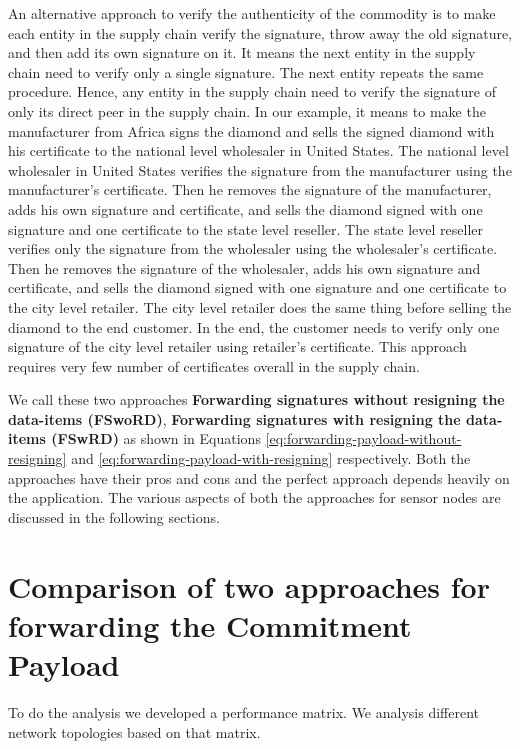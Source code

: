 	An alternative approach to verify the authenticity of the commodity is to make each entity in the supply chain verify the signature, throw away the old signature, and then add its own signature on it. 
	It means the next entity in the supply chain need to verify only a single signature.
	The next entity repeats the same procedure.
	Hence, any entity in the supply chain need to verify the signature of only its direct peer in the supply chain. 
	In our example, it means to make the manufacturer from Africa signs the diamond and sells the signed diamond with his certificate to the national level wholesaler in United States.
	The national level wholesaler in United States verifies the signature from the manufacturer using the manufacturer's certificate.
	Then he removes the signature of the manufacturer, adds his own signature and certificate, and sells the diamond signed with one signature and one certificate to the state level reseller.
	The state level reseller verifies only the signature from the wholesaler using the wholesaler's certificate.
	Then he removes the signature of the wholesaler, adds his own signature and certificate, and sells the diamond signed with one signature and one certificate to the city level retailer.
	The city level retailer does the same thing before selling the diamond to the end customer.
	In the end, the customer needs to verify only one signature of the city level retailer using retailer's certificate.
	This approach requires very few number of certificates overall in the supply chain.

	We call these two approaches \textbf{Forwarding signatures without resigning the data-items (FSwoRD)}, \textbf{Forwarding signatures with resigning the data-items (FSwRD)} as shown in Equations \ref{eq:forwarding-payload-without-resigning} and \ref{eq:forwarding-payload-with-resigning} respectively.
	Both the approaches have their pros and cons and the perfect approach depends heavily on the application.
	The various aspects of both the approaches for sensor nodes are discussed in the following sections.

	\section{Comparison of two approaches for forwarding the Commitment Payload}
		To do the analysis we developed a performance matrix. 
		We analysis different network topologies based on that matrix.

